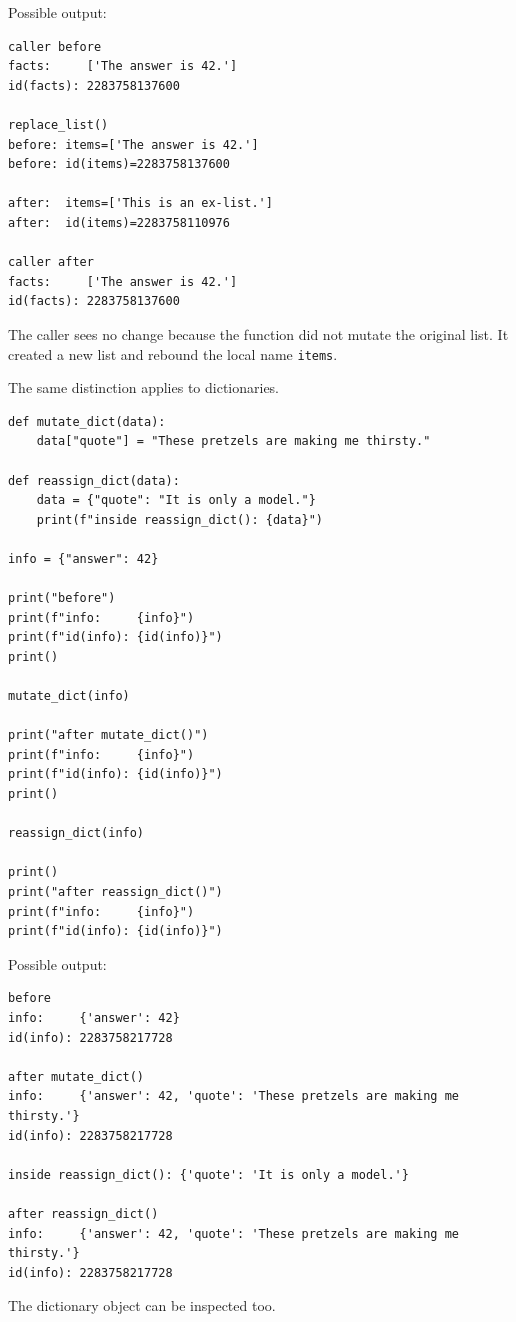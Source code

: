 Possible output:

\begin{verbatim}
caller before
facts:     ['The answer is 42.']
id(facts): 2283758137600

replace_list()
before: items=['The answer is 42.']
before: id(items)=2283758137600

after:  items=['This is an ex-list.']
after:  id(items)=2283758110976

caller after
facts:     ['The answer is 42.']
id(facts): 2283758137600
\end{verbatim}

The caller sees no change because the function did not mutate the original list. It created a new list and rebound the local name \texttt{items}.

The same distinction applies to dictionaries.

\begin{verbatim}
def mutate_dict(data):
    data["quote"] = "These pretzels are making me thirsty."

def reassign_dict(data):
    data = {"quote": "It is only a model."}
    print(f"inside reassign_dict(): {data}")

info = {"answer": 42}

print("before")
print(f"info:     {info}")
print(f"id(info): {id(info)}")
print()

mutate_dict(info)

print("after mutate_dict()")
print(f"info:     {info}")
print(f"id(info): {id(info)}")
print()

reassign_dict(info)

print()
print("after reassign_dict()")
print(f"info:     {info}")
print(f"id(info): {id(info)}")
\end{verbatim}

Possible output:

\begin{verbatim}
before
info:     {'answer': 42}
id(info): 2283758217728

after mutate_dict()
info:     {'answer': 42, 'quote': 'These pretzels are making me thirsty.'}
id(info): 2283758217728

inside reassign_dict(): {'quote': 'It is only a model.'}

after reassign_dict()
info:     {'answer': 42, 'quote': 'These pretzels are making me thirsty.'}
id(info): 2283758217728
\end{verbatim}

The dictionary object can be inspected too.

